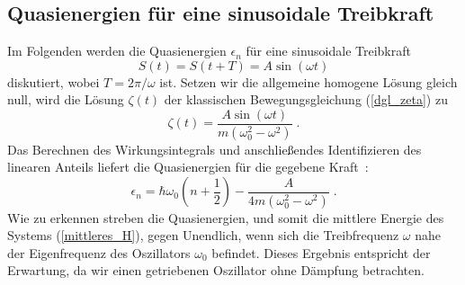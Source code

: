       \subsection{Quasienergien für eine sinusoidale Treibkraft}
      \label{epsilon_sinuskraft}
        Im Folgenden werden die Quasienergien $\epsilon_n$ für eine sinusoidale Treibkraft %
        \begin{equation}
          S(t) = S(t+T) = A\sin(\omega t)
        \end{equation}
        diskutiert, wobei $T=2\pi / \omega$ ist.
        Setzen wir die allgemeine homogene Lösung gleich null, wird die Lösung $\zeta(t)$ der klassischen Bewegungsgleichung (\ref{dgl_zeta}) zu~\cite{mads}
        \begin{equation}
          \zeta(t) = \frac{A\sin(\omega t)}{m(\omega_0^2 - \omega^2)} \;
          \label{zeta_sinuskraft}.
        \end{equation}
        Das Berechnen des Wirkungsintegrals und anschließendes Identifizieren des linearen Anteils liefert die Quasienergien für die gegebene Kraft~\cite{mads}:
        \begin{equation}
          \epsilon_n  = \hbar \omega_0\left(n+\frac{1}{2}\right) - \frac{A}{4m(\omega_0^2-\omega^2)} \;.
        \end{equation}
        Wie zu erkennen streben die Quasienergien, und somit die mittlere Energie des Systems (\ref{mittleres_H}), gegen Unendlich, wenn sich die Treibfrequenz $\omega$ nahe der Eigenfrequenz des Oszillators $\omega_0 $ befindet.
        Dieses Ergebnis entspricht der Erwartung, da wir einen getriebenen Oszillator ohne Dämpfung betrachten.


